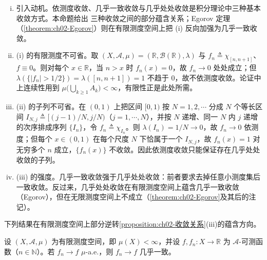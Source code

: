 \documentclass[../../main.tex]{subfiles}%
\begin{document}
\begin{remark}\label{remark:ch02-收敛关系}
\begin{enumerate}[(i)]
\item 引入动机。依测度收敛、几乎一致收敛与几乎处处收敛是积分理论中三种基本收敛方式。本命题给出 三种收敛之间的部分蕴含关系；Egorov 定理（\cref{theorem:ch02-Egorov}）则在有限测度空间上把 (i) 反向加强为几乎一致收敛。
\item (i) 的有限测度不可省。取 $(X,\mathscr A,\mu)=(\mathbb{R},\mathscr B(\mathbb{R}),\lambda)$ 与 $f_n\triangleq\chi_{[n,n+1]}$、$f\equiv0$。则对每个 $x\in\mathbb{R}$，当 $n>x$ 时 $f_n(x)=0$，故 $f_n\to0$ 处处成立；但 $\lambda(\{|f_n|>1/2\})=\lambda([n,n+1])=1$ 不趋于 $0$，故不依测度收敛。论证中上连续性用到 $\mu\bigl(\bigcup_{k\geqslant1}A_k\bigr)<\infty$，有限性正是此处所需。
\item (ii) 的子列不可省。在 $(0,1)$ 上把区间 $[0,1)$ 按 $N=1,2,\cdots$ 分成 $N$ 个等长区间 $I_{N,j}\triangleq[(j-1)/N,j/N)$（$j=1,\cdots,N$），并按 $N$ 递增、同一 $N$ 内 $j$ 递增的次序排成序列 $\{I_n\}$，令 $f_n\triangleq\chi_{I_n}$。则 $\lambda(I_n)=1/N\to0$，故 $f_n\to0$ 依测度；但每个 $x\in(0,1)$ 在每个尺度 $N$ 下恰属于一个 $I_{N,j}$，故 $f_n(x)=1$ 对无穷多个 $n$ 成立，$\{f_n(x)\}$ 不收敛。因此依测度收敛只能保证存在几乎处处收敛的子列。
\item (iii) 的强度。几乎一致收敛强于几乎处处收敛：前者要求去掉任意小测度集后一致收敛。反过来，几乎处处收敛在有限测度空间上蕴含几乎一致收敛（Egorov），但在无限测度空间上不成立（\cref{theorem:ch02-Egorov}及其后的注记）。
\end{enumerate}
\end{remark}

下列结果在有限测度空间上部分逆转\cref{proposition:ch02-收敛关系}(iii)的蕴含方向。

\begin{theorem}[Egorov]\label{theorem:ch02-Egorov}
设 $(X,\mathscr A,\mu)$ 为有限测度空间，即 $\mu(X)<\infty$，并设 $f,f_n:X\to\mathbb{R}$ 为 $\mathscr A$-可测函数（$n\in\mathbb{N}$）。若 $f_n\to f$ $\mu$-a.e.，则 $f_n\to f$ 几乎一致。
\end{theorem}
\end{document}
